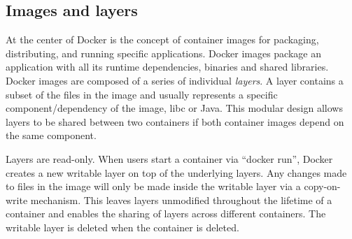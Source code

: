 
\subsection{Images and layers}
\label{sec-image-layers}

At the center of Docker is the concept of container images for packaging,
distributing, and running specific applications.
%
%
%
Docker images package an application with all its runtime dependencies, \eg
binaries and shared libraries.
Docker images are composed of a series of individual \emph{layers}.
A layer contains a subset of the files in the image and 
usually represents a specific component/dependency of the image, \eg libc or
Java. This modular design allows layers to be shared between two containers if both
container images depend on the same component. 


Layers are read-only. When users start a
container via ``docker run'', Docker creates a new writable layer on top of the
underlying layers. Any changes made to files in the image will only be made
inside the writable layer via a copy-on-write mechanism. This leaves layers
unmodified throughout the lifetime of a container and enables the sharing of
layers across different containers. The writable layer is deleted
when the container is deleted.
 


